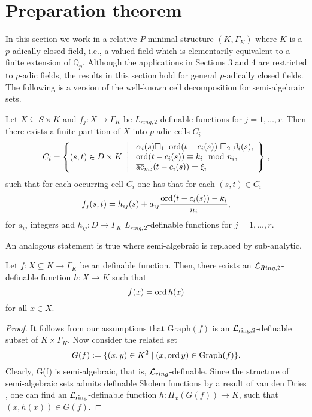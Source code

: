 \section{Preparation theorem} \label{sec:prep}

In this section we work in a relative $P$-minimal structure $(K,\Gamma_K)$ where $K$ is a $p$-adically closed field, i.e., a valued field which is elementarily equivalent to a finite extension of $\mathbb{Q}_p$. Although the applications in Sections 3 and 4 are restricted to $p$-adic fields, the results in this section hold for general $p$-adically closed fields. The following is a version of the well-known cell decomposition for semi-algebraic sets. 

\begin{prop}\label{prop.celldecomp}
Let $X \subseteq  S \times K$ and $f_j:X \to\Gamma_K $ be $L_{ring,2}$-definable functions for $j=1,\ldots,r$. Then there exists a finite partition of $X$ into $p$-adic cells $C_i$ 
\[C_i = \left\{(s,t) \in D\times K \ \left| \ \begin{array}{l} \alpha_i(s) \square_1 \ \ord(t-c_i(s)) \ \square_2 \ \beta_i(s),\\ \ord(t-c_i(s)) \equiv k_i\mod n_i,\\ \ac_{m_i}(t-c_i(s)) = \xi_i \end{array} \right\}\right.,\]
such that for each occurring cell $C_i$ one has that for each $(s,t)\in C_i$
\[f_j(s,t)=  h_{ij}(s)+ a_{ij}\frac{\operatorname{ord}(t- c_i(s))- k_i}{n_i},
\]
for $a_{ij}$ integers and $h_{ij}: D\to \Gamma_K$ $L_{ring,2}$-definable functions for $j=1,\ldots,r$. 
\end{prop}

An analogous statement is true where semi-algebraic is replaced by sub-analytic.  

\begin{lem}\label{lem.semialgfnc}
Let $f: X \subseteq K \to \Gamma_K$ be an definable function. Then, there exists an ${\mathcal L}_{Ring,2}$-definable function {$h: X\to K$} such that \[f(x) = \operatorname{ord} h(x)\] for all $x \in X$. 
\end{lem}
\begin{proof}

It follows from our assumptions that $\mathrm{Graph}(f)$ is an $\mathcal{L}_{\text{ring}, 2}$-definable subset of $K \times \Gamma_K$. Now consider the related set
\[ G(f) := \{(x,y) \in K^2 \mid (x, \operatorname{ord} y) \in \mathrm{Graph}(f)\}.\]
Clearly, G(f) is semi-algebraic, that is, ${\mathcal L}_{ring}$-definable. Since the structure of semi-algebraic sets admits definable Skolem functions by a result of van den Dries \cite{vdd-84}, one can find an $\mathcal{L}_{\text{ring}}$-definable function $h: \Pi_x(G(f)) \to K$, such that $(x, h(x)) \in G(f)$. 
\end{proof}


